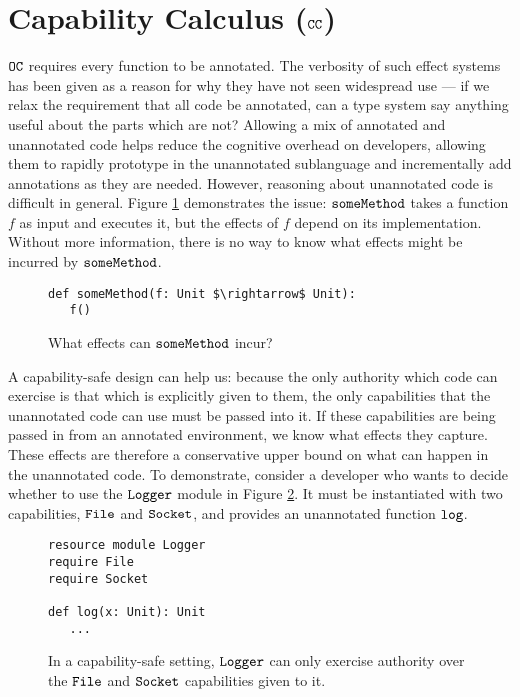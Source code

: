 



\section{Capability Calculus ($\mathtt{CC}$)}

$\mathtt{OC}$ requires every function to be annotated. The verbosity of such effect systems has been given as a reason for why they have not seen widespread use \cite{rytz2012} --- if we relax the requirement that all code be annotated, can a type system say anything useful about the parts which are not? Allowing a mix of annotated and unannotated code helps reduce the cognitive overhead on developers, allowing them to rapidly prototype in the unannotated sublanguage and incrementally add annotations as they are needed. However, reasoning about unannotated code is difficult in general. Figure \ref{fig:unannotated_reasoning} demonstrates the issue: $\mathtt{someMethod}$ takes a function $f$ as input and executes it, but the effects of $f$ depend on its implementation. Without more information, there is no way to know what effects might be incurred by $\mathtt{someMethod}$.


\begin{figure}[h]
\begin{lstlisting}
def someMethod(f: Unit $\rightarrow$ Unit):
   f()
\end{lstlisting}
\vspace{-7pt}
\caption{What effects can $\mathtt{someMethod}$ incur?}
\label{fig:unannotated_reasoning}
\end{figure}

A capability-safe design can help us: because the only authority which code can exercise is that which is explicitly given to them, the only capabilities that the unannotated code can use must be passed into it. If these capabilities are being passed in from an annotated environment, we know what effects they capture. These effects are therefore a conservative upper bound on what can happen in the unannotated code. To demonstrate, consider a developer who wants to decide whether to use the $\mathtt{Logger}$ module in Figure \ref{fig:cc_motivation}. It must be instantiated with two capabilities, $\mathtt{File}$ and $\mathtt{Socket}$, and provides an unannotated function $\mathtt{log}$.

\begin{figure}[h]
\begin{lstlisting}
resource module Logger
require File
require Socket

def log(x: Unit): Unit
   ...
\end{lstlisting}
\vspace{-7pt}
\caption{In a capability-safe setting, $\mathtt{Logger}$ can only exercise authority over the $\mathtt{File}$ and $\mathtt{Socket}$ capabilities given to it.}
\label{fig:cc_motivation}
\end{figure}

